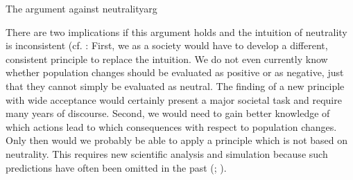 \begin{Theorem}{The argument against neutrality}{arg}

\end{Theorem}

There are two implications if this argument holds and the intuition of neutrality is inconsistent (cf. : First, we as a society would have to develop a different, consistent principle to replace the intuition. We do not even currently know whether population changes should be evaluated as positive or as negative, just that they cannot simply be evaluated as neutral. The finding of a new principle with wide acceptance would certainly present a major societal task and require many years of discourse. Second, we would need to gain better knowledge of which actions lead to which consequences with respect to population changes. Only then would we probably be able to apply a principle which is not based on neutrality. This requires new scientific analysis and simulation because such predictions have often been omitted in the past (; ). 


